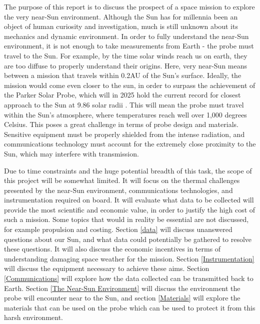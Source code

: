 \documentclass[12pt]{article}
\begin{document}
The purpose of this report is to discuss the prospect of a space mission to explore the very near-Sun environment. Although the Sun has for millennia been an object of human curiosity and investigation, much is still unknown about its mechanics and dynamic environment. In order to fully understand the near-Sun environment, it is not enough to take measurements from Earth - the probe must travel to the Sun. For example, by the time solar winds reach us on earth, they are too diffuse to properly understand their origins. Here, very near-Sun means between a mission that travels within 0.2AU of the Sun's surface. Ideally, the mission would come even closer to the sun, in order to surpass the achievement of the Parker Solar Probe, which will in 2025 hold the current record for closest approach to the Sun at 9.86 solar radii \cite{parkerpresskit}. This will mean the probe must travel within the Sun's atmosphere, where temperatures reach well over 1,000 degrees Celsius. This poses a great challenge in terms of probe design and materials. Sensitive equipment must be properly shielded from the intense radiation, and communications technology must account for the extremely close proximity to the Sun, which may interfere with transmission. 

\vspace{\baselineskip}

Due to time constraints and the huge potential breadth of this task, the scope of this project will be somewhat limited. It will focus on the thermal challenges presented by the near-Sun environment, communications technologies, and instrumentation required on board. It will evaluate what data to be collected will provide the most scientific and economic value, in order to justify the high cost of such a mission. Some topics that would in reality be essential are not discussed, for example propulsion and costing. Section \ref{data} will discuss unanswered questions about our Sun, and what data could potentially be gathered to resolve these questions. It will also discuss the economic incentives in terms of understanding damaging space weather for the mission. Section \ref{Instrumentation} will discuss the equipment necessary to achieve these aims. Section \ref{Communications} will explore how the data collected can be transmitted back to Earth. Section \ref{The Near-Sun Environment} will discuss the environment the probe will encounter near to the Sun, and section \ref{Materials} will explore the materials that can be used on the probe which can be used to protect it from this harsh environment.
\end{document}
